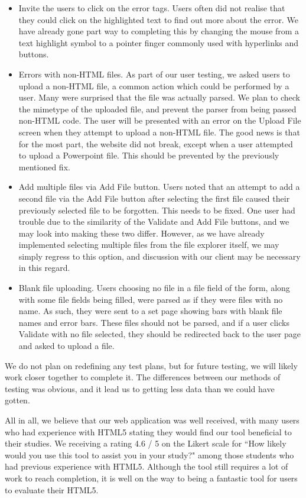\documentclass[10pt]{article}
\begin{document}
\begin{itemize}
\item Invite the users to click on the error tags. Users often did not realise that they could click on the highlighted text to find out more about the error. We have already gone part way to completing this by changing the mouse from a text highlight symbol to a pointer finger commonly used with hyperlinks and buttons.
\item Errors with non-HTML files. As part of our user testing, we asked users to upload a non-HTML file, a common action which could be performed by a user. Many were surprised that the file was actually parsed. We plan to check the mimetype of the uploaded file, and prevent the parser from being passed non-HTML code. The user will be presented with an error on the Upload File screen when they attempt to upload a non-HTML file. The good news is that for the most part, the website did not break, except when a user attempted to upload a Powerpoint file. This should be prevented by the previously mentioned fix.
\item Add multiple files via Add File button. Users noted that an attempt to add a second file via the Add File button after selecting the first file caused their previously selected file to be forgotten. This needs to be fixed. One user had trouble due to the similarity of the Validate and Add File buttons, and we may look into making these two differ. However, as we have already implemented selecting multiple files from the file explorer itself, we may simply regress to this option, and discussion with our client may be necessary in this regard.
\item Blank file uploading. Users choosing no file in a file field of the form, along with some file fields being filled, were parsed as if they were files with no name. As such, they were sent to a set page showing bars with blank file names and error bars. These files should not be parsed, and if a user clicks Validate with no file selected, they should be redirected back to the user page and asked to upload a file.
\end{itemize}

We do not plan on redefining any test plans, but for future testing, we will likely work closer together to complete it. The differences between our methods of testing was obvious, and it lead us to getting less data than we could have gotten.

All in all, we believe that our web application was well received, with many users who had experience with HTML5 stating they would find our tool beneficial to their studies. We receiving a rating 4.6 / 5 on the Likert scale for ``How likely would you use this tool to assist you in your study?" among those students who had previous experience with HTML5. Although the tool still requires a lot of work to reach completion, it is well on the way to being a fantastic tool for users to evaluate their HTML5.
\end{document}
